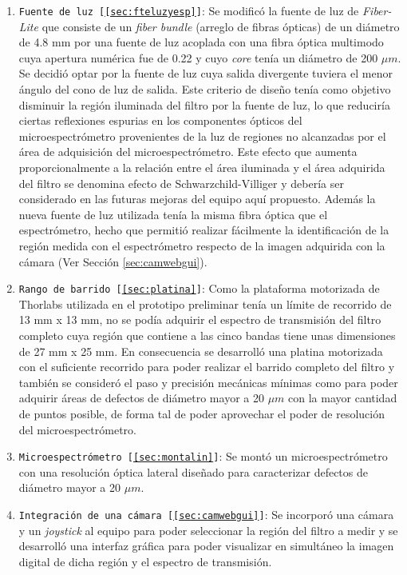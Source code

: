 \begin{enumerate}
\justifying
\item \texttt{Fuente de luz [\ref{sec:fteluzyesp}]}: Se modificó la fuente de luz de \textit{Fiber-Lite} que consiste de un \textit{fiber bundle} (arreglo de fibras ópticas) de un diámetro de 4.8 mm por una fuente de luz acoplada con una fibra óptica multimodo cuya apertura numérica fue de 0.22 y cuyo \textit{core} tenía un diámetro de 200 $\mu m$. Se decidió optar por la fuente de luz cuya salida divergente tuviera el menor ángulo del cono de luz de salida. Este criterio de diseño tenía como objetivo disminuir la región iluminada del filtro por la fuente de luz, lo que reduciría ciertas reflexiones espurias en los componentes ópticos del microespectrómetro provenientes de la luz de regiones no alcanzadas por el área de adquisición del microespectrómetro. Este efecto que aumenta proporcionalmente a la relación entre el área iluminada y el área adquirida del filtro se denomina efecto de Schwarzchild-Villiger \cite{Naora279} y debería ser considerado en las futuras mejoras del equipo aquí propuesto. Además la nueva fuente de luz utilizada tenía la misma fibra óptica que el espectrómetro, hecho que permitió realizar fácilmente la identificación de la región medida con el espectrómetro respecto de la imagen adquirida con la cámara (Ver Sección \ref{sec:camwebgui}).
\item \texttt{Rango de barrido [\ref{sec:platina}]}: Como la plataforma motorizada de Thorlabs utilizada en el prototipo preliminar tenía un límite de recorrido de 13 mm x 13 mm, no se podía adquirir el espectro de transmisión del filtro completo cuya región que contiene a las cinco bandas tiene unas dimensiones de 27 mm x 25 mm. En consecuencia se desarrolló una platina motorizada con el suficiente recorrido para poder realizar el barrido completo del filtro y también se consideró el paso y precisión mecánicas mínimas como para poder adquirir áreas de defectos de diámetro mayor a 20 $\mu m$ con la mayor cantidad de puntos posible, de forma tal de poder aprovechar el poder de resolución del microespectrómetro.
\item \texttt{Microespectrómetro [\ref{sec:montalin}]}: Se montó un microespectrómetro con una resolución óptica lateral diseñado para caracterizar defectos de diámetro mayor a 20 $\mu m$.
\item \texttt{Integración de una cámara [\ref{sec:camwebgui}]}: Se incorporó una cámara y un  \textit{joystick} al equipo para poder seleccionar la región del filtro a medir y se desarrolló una interfaz gráfica para poder visualizar en simultáneo la imagen digital de dicha región y el espectro de transmisión. 
\end{enumerate}
	
